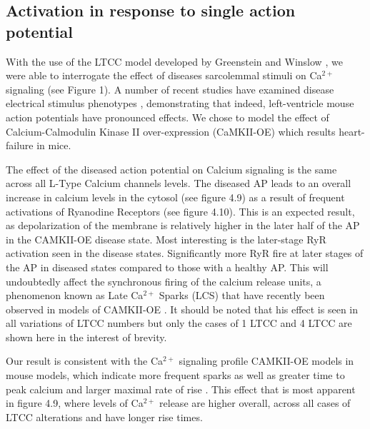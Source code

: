 \documentclass[12pt]{ucsddissertation}
\begin{document}
\subsection{Activation in response to single action potential}
With the use of the LTCC model developed by Greenstein and Winslow \cite{Greenstein2002}, we were able to interrogate the effect of diseases sarcolemmal stimuli on Ca$^{2+}$ signaling (see Figure 1). A number of recent studies have examined disease electrical stimulus phenotypes \cite{Morotti2014, Edwards2014}, demonstrating that indeed, left-ventricle mouse action potentials have pronounced effects. We chose to model the effect of Calcium-Calmodulin Kinase II over-expression (CaMKII-OE) which results heart-failure in mice.

The effect of the diseased action potential on Calcium signaling is the same across all L-Type Calcium channels levels. The diseased AP leads to an overall increase in calcium levels in the cytosol (see figure 4.9) as a result of frequent activations of Ryanodine Receptors (see figure 4.10). This is an expected result, as depolarization of the membrane is relatively higher in the later half of the AP in the CAMKII-OE disease state. Most interesting is the later-stage RyR activation seen in the disease states. Significantly more RyR fire at later stages of the AP in diseased states compared to those with a healthy AP. This will undoubtedly affect the synchronous firing of the calcium release units, a phenomenon known as Late Ca$^{2+}$ Sparks (LCS) that have recently been observed in models of CAMKII-OE \cite{Fowler2017}. It should be noted that his effect is seen in all variations of LTCC numbers but only the cases of 1 LTCC and 4 LTCC are shown here in the interest of brevity. 

Our result is consistent with the Ca$^{2+}$ signaling profile  CAMKII-OE models in mouse models, which indicate more frequent sparks as well as greater time to peak calcium and larger maximal rate of rise \cite{Guo2012a}. This effect that is most apparent in figure 4.9, where levels of Ca$^{2+}$  release are higher overall, across all cases of LTCC alterations and have longer rise times. 
\end{document}
